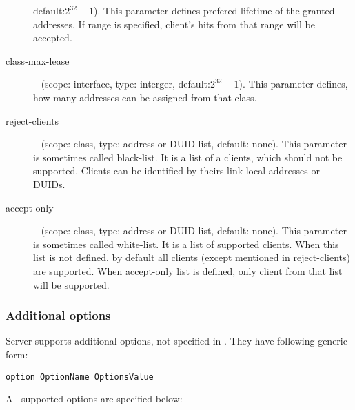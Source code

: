 \begin{description}
	    default:$2^{32}-1$). This parameter defines prefered
	    lifetime of the granted addresses. If range is specified,
	    client's hits from that range will be accepted.
\item[class-max-lease]  -- (scope: interface, type: interger,
	    default:$2^{32}-1$). This parameter defines, how many
	    addresses can be assigned from that class.
\item[reject-clients] -- (scope: class, type: address or DUID list,
	    default: none). This parameter is sometimes called
	    black-list. It is a list of a clients, which should not be
	    supported. Clients can be identified by theirs link-local
	    addresses or DUIDs.
\item[accept-only] -- (scope: class, type: address or DUID list,
	    default: none). This parameter is sometimes called
	    white-list. It is a list of supported clients. When this
	    list is not defined, by default all clients (except
	    mentioned in reject-clients) are supported. When
	    accept-only list is defined, only client from that list
	    will be supported.
\end{description}

\subsubsection{Additional options}
Server supports additional options, not specified in \cite{rfc3315}. They have
following generic form:

\begin{verbatim}
option OptionName OptionsValue
\end{verbatim}

All supported options are specified below:

